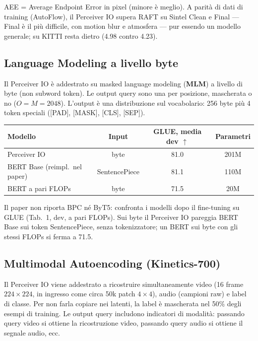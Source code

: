 \documentclass[
  11pt,
]{article}
\begin{document}
AEE = Average Endpoint Error in pixel (minore è meglio). A parità di dati di training (AutoFlow), il Perceiver IO supera RAFT su Sintel Clean e Final --- Final è il più difficile, con motion blur e atmosfera --- pur essendo un modello generale; su KITTI resta dietro (4.98 contro 4.23).

\subsection{Language Modeling a livello byte}

Il Perceiver IO è addestrato su masked language modeling (\textbf{MLM}) a livello di byte (non subword token). Le output query sono una per posizione, mascherata o no ($O = M = 2048$). L'output è una distribuzione sul vocabolario: 256 byte più 4 token speciali ([PAD], [MASK], [CLS], [SEP]).

\begin{center}
\begin{tabular}{lccc}
\toprule
\textbf{Modello} & \textbf{Input} & \textbf{GLUE, media dev $\uparrow$} & \textbf{Parametri} \\
\midrule
Perceiver IO & byte & 81.0 & 201M \\
BERT Base (reimpl.\ nel paper) & SentencePiece & 81.1 & 110M \\
BERT a pari FLOPs & byte & 71.5 & 20M \\
\bottomrule
\end{tabular}
\end{center}

Il paper non riporta BPC né ByT5: confronta i modelli dopo il fine-tuning su GLUE (Tab.~1, dev, a pari FLOPs). Sui byte il Perceiver IO pareggia BERT Base sui token SentencePiece, senza tokenizzatore; un BERT sui byte con gli stessi FLOPs si ferma a 71.5.

\subsection{Multimodal Autoencoding (Kinetics-700)}

Il Perceiver IO viene addestrato a ricostruire simultaneamente video (16 frame $224 \times 224$, in ingresso come circa 50k patch $4 \times 4$), audio (campioni raw) e label di classe. Per non farla copiare nei latenti, la label è mascherata nel 50\% degli esempi di training. Le output query includono indicatori di modalità: passando query video si ottiene la ricostruzione video, passando query audio si ottiene il segnale audio, ecc.
\end{document}
